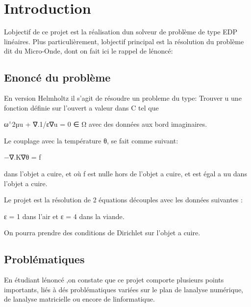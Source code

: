 \hypertarget{index_intro_sec}{}\section{Introduction}\label{index_intro_sec}
L\textquotesingle{}objectif de ce projet est la réalisation d\textquotesingle{}un solveur de problème de type E\+DP linéaires. Plus particulièrement, l\textquotesingle{}objectif principal est la résolution du problème dit du Micro-\/\+Onde, dont on fait ici le rappel de l\textquotesingle{}énoncé\+:\hypertarget{index_a}{}\subsection{Enoncé du problème}\label{index_a}
En version Helmholtz il s’agit de résoudre un probleme du type\+: Trouver u une fonction définie sur l’ouvert  a valeur dans C tel que

ω$^\wedge$2µu + ∇.1/ε∇u = 0 ∈ Ω avec des données aux bord imaginaires.

Le couplage avec la température θ, se fait comme suivant\+:

−∇.\+K∇θ = f

dans l’objet a cuire, et où f est nulle hors de l’objet a cuire, et est égal a uu dans l’objet a cuire.

Le projet est la résolution de 2 équations découples avec les données suivantes \+:

ε = 1 dans l’air et ε = 4 dans la viande.

On pourra prendre des conditions de Dirichlet sur l’objet a cuire.\hypertarget{index_Problématiques}{}\subsection{Problématiques}\label{index_Problématiques}
En étudiant l\textquotesingle{}énoncé ,on constate que ce projet comporte plusieurs points importants, liés à dés problématiques variées sur le plan de l\textquotesingle{}analyse numérique, de l\textquotesingle{}analyse matricielle ou encore de l\textquotesingle{}informatique.


